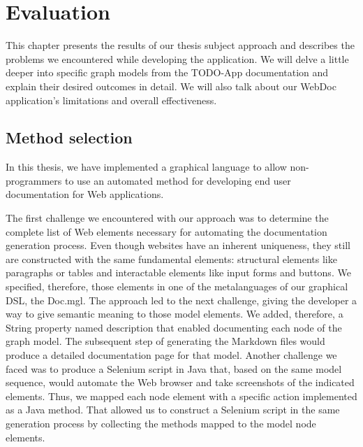 \chapter{Evaluation}\label{ch:eval}

This chapter presents the results of our thesis subject approach and describes the problems we encountered while developing the application. We will delve a little deeper into specific graph models from the TODO-App documentation and explain their desired outcomes in detail. We will also talk about our WebDoc application's limitations and overall effectiveness.

\section{Method selection}\label{sec:meth}

In this thesis, we have implemented a graphical language to allow non-programmers to use an automated method for developing end user documentation for Web applications.

The first challenge we encountered with our approach was to determine the complete list of Web elements necessary for automating the documentation generation process. Even though websites have an inherent uniqueness, they still are constructed with the same fundamental elements: structural elements like paragraphs or tables and interactable elements like input forms and buttons. We specified, therefore, those elements in one of the metalanguages of our graphical DSL, the Doc.mgl. The approach led to the next challenge, giving the developer a way to give semantic meaning to those model elements. We added, therefore, a String property named description that enabled documenting each node of the graph model. The subsequent step of generating the Markdown files would produce a detailed documentation page for that model.
Another challenge we faced was to produce a Selenium script in Java that, based on the same model sequence, would automate the Web browser and take screenshots of the indicated elements. Thus, we mapped each node element with a specific action implemented as a Java method. That allowed us to construct a Selenium script in the same generation process by collecting the methods mapped to the model node elements.


